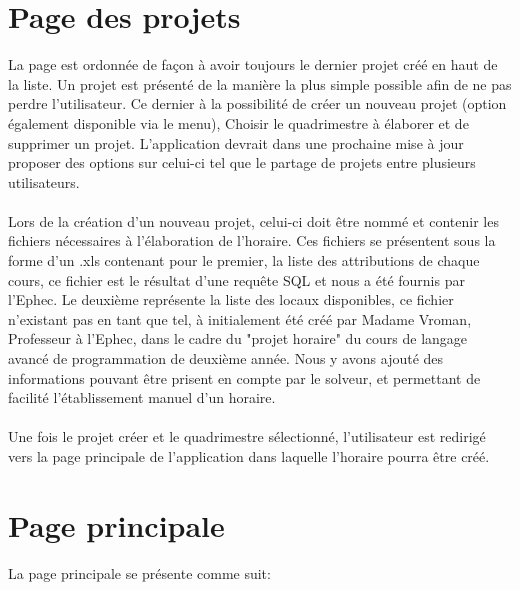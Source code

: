 \section{Page des projets}
La page est ordonnée de façon à avoir toujours le dernier projet créé en haut de la liste. Un projet est présenté de la manière la plus simple possible afin de ne pas perdre l'utilisateur. Ce dernier à la possibilité de créer un nouveau projet (option également disponible via le menu), Choisir le quadrimestre à élaborer et de supprimer un projet. L'application devrait dans une prochaine mise à jour proposer des options sur celui-ci tel que le partage de projets entre plusieurs utilisateurs.\\
\\
Lors de la création d'un nouveau projet, celui-ci doit être nommé et contenir les fichiers nécessaires à l'élaboration de l'horaire. Ces fichiers se présentent sous la forme d'un .xls contenant pour le premier, la liste des attributions de chaque cours, ce fichier est le résultat d'une requête SQL et nous a été fournis par l'Ephec. Le deuxième représente la liste des locaux disponibles, ce fichier n'existant pas en tant que tel, à initialement été créé par Madame Vroman, Professeur à l'Ephec, dans le cadre du "projet horaire" du cours de langage avancé de programmation de deuxième année. Nous y avons ajouté des informations pouvant être prisent en compte par le solveur, et permettant de facilité l'établissement manuel d'un horaire.\\
\\
Une fois le projet créer et le quadrimestre sélectionné, l'utilisateur est redirigé vers la page principale de l'application dans laquelle l'horaire pourra être créé.

\section{Page principale}
La page principale se présente comme suit:\\

